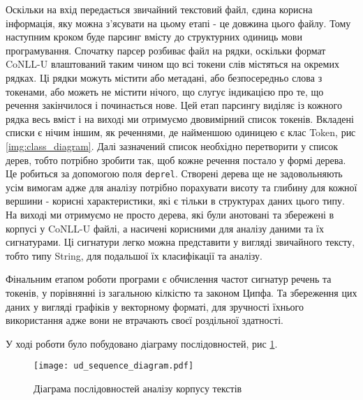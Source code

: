 Оскільки на вхід передається звичайний текстовий файл, єдина корисна інформація,
яку можна з'ясувати на цьому етапі - це довжина цього файлу. Тому наступним кроком буде
парсинг вмісту до структурних одиниць мови програмування. Спочатку парсер розбиває
файл на рядки, оскільки формат CoNLL-U влаштований таким чином що всі токени слів
містяться на окремих рядках. Ці рядки можуть містити або метадані, або безпосередньо
слова з токенами, або можеть не містити нічого, що слугує індикацією про те, що
речення закінчилося і починається нове. Цей етап парсингу виділяє із кожного рядка
весь вміст і на виході ми отримуємо двовимірний список токенів. Вкладені
списки є нічим іншим, як реченнями, де найменшою одиницею є клас Token,
рис \ref{img:class_diagram}. Далі зазначений список необхідно перетворити у список дерев,
тобто потрібно зробити так, щоб кожне речення постало у формі дерева.
Це робиться за допомогою поля \texttt{deprel}. Створені дерева ще не задовольняють
усім вимогам адже для аналізу потрібно порахувати висоту та глибину для кожної вершини - 
корисні характеристики, які є тільки в структурах даних цього типу.
На виході ми отримуємо не просто дерева, які були анотовані та збережені в корпусі
у CoNLL-U файлі, а насичені корисними для аналізу даними та їх сигнатурами.
Ці сигнатури легко можна представити у вигляді звичайного тексту, тобто типу String, для
подальшої їх класифікації та аналізу.

Фінальним етапом роботи програми є обчислення частот сигнатур речень та токенів,
у порівнянні із загальною кілкістю та законом Ципфа. Та збереження цих даних
у вигляді графіків у векторному форматі, для зручності їхнього використання адже
вони не втрачають своєї роздільної здатності.

У ході роботи було побудовано діаграму послідовностей, рис \ref{img:sequence_diagram}.

\begin{figure}[p]
  \begin{center}
    \texttt{[image: ud\_sequence\_diagram.pdf]}
  \end{center}
  \caption{Діаграма послідовностей аналізу корпусу текстів}
  \label{img:sequence_diagram}
\end{figure}
\newpage


